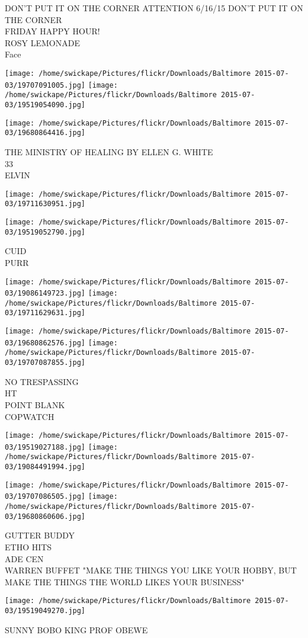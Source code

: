 \documentclass[10pt,letterpaper]{article}
\begin{document}
DON'T PUT IT ON THE CORNER ATTENTION 6/16/15 DON'T PUT IT ON THE CORNER\\
FRIDAY HAPPY HOUR!\\
ROSY LEMONADE\\
Face
\pagebreak

\texttt{[image: /home/swickape/Pictures/flickr/Downloads/Baltimore 2015-07-03/19707091005.jpg]}
\texttt{[image: /home/swickape/Pictures/flickr/Downloads/Baltimore 2015-07-03/19519054090.jpg]}

\vspace{0.25in}
\texttt{[image: /home/swickape/Pictures/flickr/Downloads/Baltimore 2015-07-03/19680864416.jpg]}

THE MINISTRY OF HEALING BY ELLEN G. WHITE\\
33\\
ELVIN
\pagebreak

\texttt{[image: /home/swickape/Pictures/flickr/Downloads/Baltimore 2015-07-03/19711630951.jpg]}

\vspace{0.25in}
\texttt{[image: /home/swickape/Pictures/flickr/Downloads/Baltimore 2015-07-03/19519052790.jpg]}

CUID\\
PURR
\pagebreak

\texttt{[image: /home/swickape/Pictures/flickr/Downloads/Baltimore 2015-07-03/19086149723.jpg]}
\texttt{[image: /home/swickape/Pictures/flickr/Downloads/Baltimore 2015-07-03/19711629631.jpg]}

\texttt{[image: /home/swickape/Pictures/flickr/Downloads/Baltimore 2015-07-03/19680862576.jpg]}
\texttt{[image: /home/swickape/Pictures/flickr/Downloads/Baltimore 2015-07-03/19707087855.jpg]}

NO TRESPASSING\\
HT\\
POINT BLANK\\
COPWATCH
\pagebreak

\texttt{[image: /home/swickape/Pictures/flickr/Downloads/Baltimore 2015-07-03/19519027188.jpg]}
\texttt{[image: /home/swickape/Pictures/flickr/Downloads/Baltimore 2015-07-03/19084491994.jpg]}

\texttt{[image: /home/swickape/Pictures/flickr/Downloads/Baltimore 2015-07-03/19707086505.jpg]}
\texttt{[image: /home/swickape/Pictures/flickr/Downloads/Baltimore 2015-07-03/19680860606.jpg]}

GUTTER BUDDY\\
ETHO HITS\\
ADE CEN\\
WARREN BUFFET "MAKE THE THINGS YOU LIKE YOUR HOBBY, BUT MAKE THE THINGS THE WORLD LIKES YOUR BUSINESS"
\pagebreak

\texttt{[image: /home/swickape/Pictures/flickr/Downloads/Baltimore 2015-07-03/19519049270.jpg]}

SUNNY BOBO KING PROF OBEWE
\pagebreak
\end{document}
